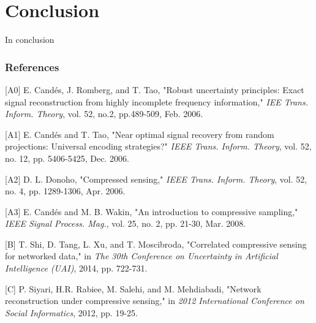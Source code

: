 \documentclass{article} %
\begin{document}
\section{Conclusion}
In conclusion 







\subsubsection*{References}
\small{



[A0] E. Cand\'{e}s, J. Romberg, and T. Tao, "Robust uncertainty principles: Exact signal reconstruction from highly incomplete frequency information," {\it IEE Trans. Inform. Theory}, vol. 52, no.2, pp.489-509, Feb. 2006.

[A1] E. Cand\'{e}s and T. Tao, "Near optimal signal recovery from random projections: Universal encoding strategies?" {\it IEEE Trans. Inform. Theory}, vol. 52, no. 12, pp. 5406-5425, Dec. 2006.

[A2] D. L. Donoho, "Compressed sensing," {\it IEEE Trans. Inform. Theory}, vol. 52, no. 4, pp. 1289-1306, Apr. 2006.

[A3] E. Cand\'{e}s and M. B. Wakin, "An introduction to compressive sampling," {\it IEEE Signal Process. Mag.}, vol. 25, no. 2, pp. 21-30, Mar. 2008.



[B] T. Shi, D. Tang, L. Xu, and T. Moscibroda, "Correlated compressive sensing for networked data," in {\it The 30th Conference on Uncertainty in Artificial Intelligence (UAI)}, 2014, pp. 722-731.

[C] P. Siyari, H.R. Rabiee, M. Salehi, and M. Mehdiabadi, "Network reconstruction under compressive sensing," in {\it 2012 International Conference on Social Informatics}, 2012, pp. 19-25.

}
\end{document}
